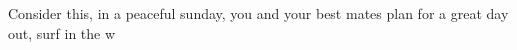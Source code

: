Consider this, in a peaceful sunday, you and your best mates plan for a great day out, surf in the w 